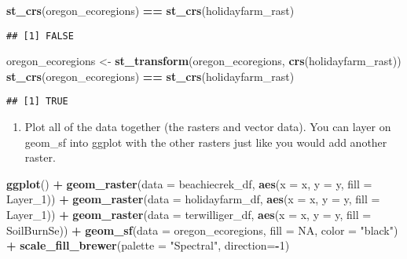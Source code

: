 \documentclass[
]{article}
\newenvironment{Shaded}{\begin{snugshade}}{\end{snugshade}}
\newcommand{\AttributeTok}[1]{\textcolor[rgb]{0.13,0.29,0.53}{#1}}
\newcommand{\ConstantTok}[1]{\textcolor[rgb]{0.56,0.35,0.01}{#1}}
\newcommand{\DecValTok}[1]{\textcolor[rgb]{0.00,0.00,0.81}{#1}}
\newcommand{\FunctionTok}[1]{\textcolor[rgb]{0.13,0.29,0.53}{\textbf{#1}}}
\newcommand{\NormalTok}[1]{#1}
\newcommand{\OtherTok}[1]{\textcolor[rgb]{0.56,0.35,0.01}{#1}}
\newcommand{\SpecialCharTok}[1]{\textcolor[rgb]{0.81,0.36,0.00}{\textbf{#1}}}
\newcommand{\StringTok}[1]{\textcolor[rgb]{0.31,0.60,0.02}{#1}}
\providecommand{\tightlist}{%
  \setlength{\itemsep}{0pt}\setlength{\parskip}{0pt}}
\begin{document}
\begin{Shaded}
\begin{Highlighting}[]
\FunctionTok{st\_crs}\NormalTok{(oregon\_ecoregions) }\SpecialCharTok{==} \FunctionTok{st\_crs}\NormalTok{(holidayfarm\_rast)}
\end{Highlighting}
\end{Shaded}

\begin{verbatim}
## [1] FALSE
\end{verbatim}

\begin{Shaded}
\begin{Highlighting}[]
\NormalTok{oregon\_ecoregions }\OtherTok{\textless{}{-}} \FunctionTok{st\_transform}\NormalTok{(oregon\_ecoregions, }\FunctionTok{crs}\NormalTok{(holidayfarm\_rast))}
\FunctionTok{st\_crs}\NormalTok{(oregon\_ecoregions) }\SpecialCharTok{==} \FunctionTok{st\_crs}\NormalTok{(holidayfarm\_rast)}
\end{Highlighting}
\end{Shaded}

\begin{verbatim}
## [1] TRUE
\end{verbatim}

\begin{enumerate}
\def\labelenumi{\alph{enumi}.}
\setcounter{enumi}{2}
\tightlist
\item
  Plot all of the data together (the rasters and vector data). You can
  layer on geom\_sf into ggplot with the other rasters just like you
  would add another raster.
\end{enumerate}

\begin{Shaded}
\begin{Highlighting}[]
\FunctionTok{ggplot}\NormalTok{() }\SpecialCharTok{+}
  \FunctionTok{geom\_raster}\NormalTok{(}\AttributeTok{data =}\NormalTok{ beachiecrek\_df, }\FunctionTok{aes}\NormalTok{(}\AttributeTok{x =}\NormalTok{ x, }\AttributeTok{y =}\NormalTok{ y, }\AttributeTok{fill =}\NormalTok{ Layer\_1)) }\SpecialCharTok{+}
  \FunctionTok{geom\_raster}\NormalTok{(}\AttributeTok{data =}\NormalTok{ holidayfarm\_df, }\FunctionTok{aes}\NormalTok{(}\AttributeTok{x =}\NormalTok{ x, }\AttributeTok{y =}\NormalTok{ y, }\AttributeTok{fill =}\NormalTok{ Layer\_1)) }\SpecialCharTok{+}
  \FunctionTok{geom\_raster}\NormalTok{(}\AttributeTok{data =}\NormalTok{ terwilliger\_df, }\FunctionTok{aes}\NormalTok{(}\AttributeTok{x =}\NormalTok{ x, }\AttributeTok{y =}\NormalTok{ y, }\AttributeTok{fill =}\NormalTok{ SoilBurnSe)) }\SpecialCharTok{+}
  \FunctionTok{geom\_sf}\NormalTok{(}\AttributeTok{data =}\NormalTok{ oregon\_ecoregions, }\AttributeTok{fill =} \ConstantTok{NA}\NormalTok{, }\AttributeTok{color =} \StringTok{"black"}\NormalTok{) }\SpecialCharTok{+}
  \FunctionTok{scale\_fill\_brewer}\NormalTok{(}\AttributeTok{palette =} \StringTok{"Spectral"}\NormalTok{, }\AttributeTok{direction=}\SpecialCharTok{{-}}\DecValTok{1}\NormalTok{)}
\end{Highlighting}
\end{Shaded}
\end{document}
